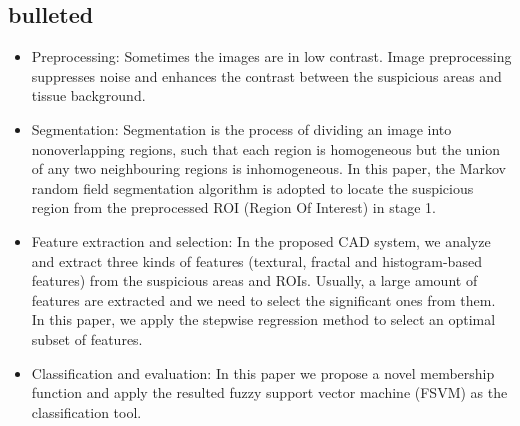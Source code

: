 \subsection{bulleted}

\begin{itemize}


       
\item  Preprocessing: Sometimes the images are in low contrast. Image preprocessing suppresses noise and enhances the contrast between the suspicious areas and tissue background. 
\item Segmentation: Segmentation is the process of dividing an image into nonoverlapping regions, such that each region
is homogeneous but the union of any two neighbouring regions is inhomogeneous. In this paper, the Markov random field segmentation algorithm is adopted to locate the suspicious region from the preprocessed ROI (Region Of Interest) in stage 1. 
\item Feature extraction and selection: In the proposed CAD system, we analyze and extract three kinds of features (textural, fractal and histogram-based features) from the suspicious areas and ROIs. Usually, a large amount of features are extracted and we need to select the significant ones from them. In this paper, we apply the stepwise regression method to select an optimal subset of features.
\item Classification and evaluation: In this paper we propose a novel membership function and apply the resulted fuzzy support vector machine (FSVM) as the classification tool. 

\end{itemize}

